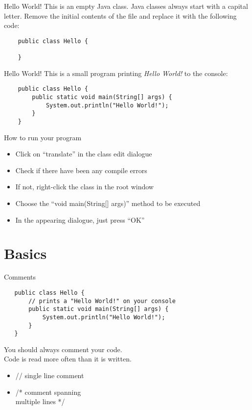 \begin{frame}[fragile]{Hello World!}
    This is an empty Java class.
      Java classes always start with a capital letter.
      Remove the initial contents of the file and replace it with the following code:
    \begin{lstlisting}
    public class Hello {

    }
    \end{lstlisting}
\end{frame}

\begin{frame}[fragile]{Hello World!}
    This is a small program printing \emph{Hello World!} to the console:
    \begin{lstlisting}
    public class Hello {
        public static void main(String[] args) {
            System.out.println("Hello World!");
        }
    }
    \end{lstlisting}
\end{frame}

\begin{frame}[fragile]{How to run your program}
   \begin{itemize}
      \item Click on ``translate'' in the class edit dialogue
      \item Check if there have been any compile errors
      \item If not, right-click the class in the root window
      \item Choose the ``void main(String[] args)'' method to be executed
      \item In the appearing dialogue, just press ``OK''
  \end{itemize}
\end{frame}

\section{Basics}

\begin{frame}[fragile]{Comments}
   \begin{lstlisting}
   public class Hello {
       // prints a "Hello World!" on your console
       public static void main(String[] args) {
           System.out.println("Hello World!");
       }
   }
   \end{lstlisting}
   You should always comment your code. \\
   Code is read more often than it is written.
   \begin{itemize}
       \item // single line comment
       \item /* comment spanning \\
           multiple lines */
   \end{itemize}
\end{frame}

